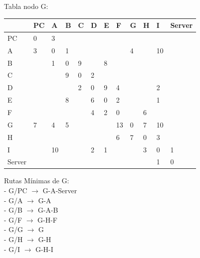 \documentclass[a4paper]{article}
\begin{document}
\begin{table}[ht]
Tabla nodo G:\\
\begin{tabular}{|l|l|l|l|l|l|l|l|l|l|l|l|}
\hline
       & PC & A  & B & C & D & E & F  & G & H & I  & Server \\ \hline
PC     & 0  & 3  &   &   &   &   &    &   &   &    &        \\ \hline
A      & 3  & 0  & 1 &   &   &   &    & 4 &   & 10 &        \\ \hline
B      &    & 1  & 0 & 9 &   & 8 &    &   &   &    &        \\ \hline
C      &    &    & 9 & 0 & 2 &   &    &   &   &    &        \\ \hline
D      &    &    &   & 2 & 0 & 9 & 4  &   &   & 2  &        \\ \hline
E      &    &    & 8 &   & 6 & 0 & 2  &   &   & 1  &        \\ \hline
F      &    &    &   &   & 4 & 2 & 0  &   & 6 &    &        \\ \hline
G      & 7  & 4  & 5 &   &   &   & 13 & 0 & 7 & 10 &        \\ \hline
H      &    &    &   &   &   &   & 6  & 7 & 0 & 3  &        \\ \hline
I      &    & 10 &   &   & 2 & 1 &    &   & 3 & 0  & 1      \\ \hline
Server &    &    &   &   &   &   &    &   &   & 1  & 0      \\ \hline
\end{tabular}

Rutas Mínimas de G:\\
-	G/PC  $\rightarrow$  G-A-Server\\
-	G/A  $\rightarrow$  G-A\\
-	G/B  $\rightarrow$  G-A-B\\
-	G/F  $\rightarrow$  G-H-F\\
-	G/G  $\rightarrow$  G\\
-	G/H  $\rightarrow$  G-H\\
-	G/I  $\rightarrow$  G-H-I\\
\end{table}

\clearpage
\end{document}
